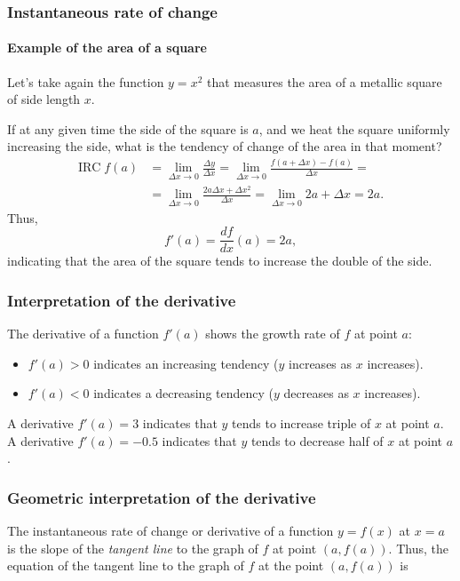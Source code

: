 \begin{frame}
	\frametitle{Instantaneous rate of change}
	\framesubtitle{Example of the area of a square}
	Let's take again the function $y=x^2$ that measures the area of a metallic square of side length $x$.
	
	If at any given time the side of the square is $a$, and we heat the square uniformly increasing the side, what is the tendency of change of the area in that moment?
	\begin{align*}
		\mbox{IRC}\;f(a) & =\lim_{\Delta x\rightarrow 0}\frac{\Delta y}{\Delta x}=\lim_{\Delta x\rightarrow 0}\frac{f(a+\Delta x)-f(a)}{\Delta x} = \\
		                 & =\lim_{\Delta x\rightarrow 0}\frac{2a\Delta x+\Delta x^2}{\Delta x}=\lim_{\Delta x\rightarrow 0} 2a+\Delta x= 2a.        
	\end{align*}
	Thus,
	\[
		f'(a)=\frac{df}{dx}(a)=2a,
	\]
	indicating that the area of the square tends to increase the double of the side.
\end{frame}


\begin{frame}
	\frametitle{Interpretation of the derivative}
	The derivative of a function $f'(a)$ shows the growth rate of $f$ at point $a$:
	\begin{itemize}
		\item $f'(a)>0$ indicates an increasing tendency ($y$ increases as $x$ increases).
		\item $f'(a)<0$ indicates a decreasing tendency ($y$ decreases as $x$ increases).
	\end{itemize}
	
	 A derivative $f'(a)=3$ indicates that $y$ tends to increase triple of $x$ at point $a$. 
	A derivative $f'(a)=-0.5$ indicates that $y$ tends to decrease half of $x$ at point $a$. 
\end{frame}


\begin{frame}
	\frametitle{Geometric interpretation of the derivative}
	
	The instantaneous rate of change or derivative of a function $y=f(x)$ at $x=a$ is the slope of the \emph{tangent line} to the graph of $f$ at point $(a,f(a))$. 
	Thus, the equation of the tangent line to the graph of $f$ at the point $(a,f(a))$ is
	
	\begin{center}
		
	\end{center}
\end{frame}


